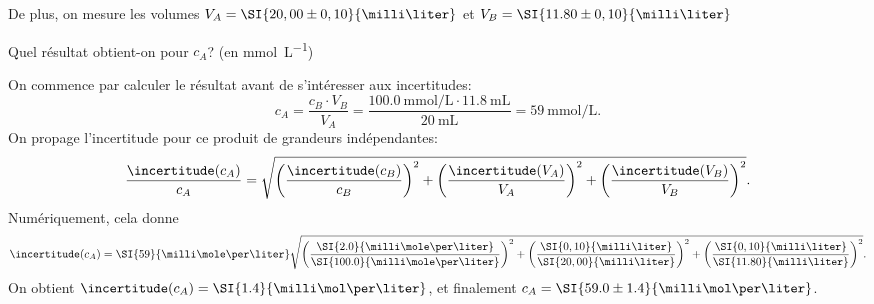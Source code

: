 De plus, on mesure les volumes \( V_A = \SI{20,00\pm 0,10}{\milli\liter} \) et \( V_B = \SI{11.80\pm 0,10}{\milli\liter} \)



\begin{enonce}
  Quel résultat obtient-on pour $c_A$? (en \si{\milli\mol\per\liter})
\end{enonce}


\begin{corrige}
  On commence par calculer le résultat avant de s'intéresser aux incertitudes:
  \[
     c_A=\frac{c_B\cdot V_B}{V_A}= \frac{\SI{100.0}{\milli\mole\per\liter}\cdot \SI{11.8}{\milli\liter}}{\SI{20}{\milli\liter}} = \SI{59}{\milli\mole\per\liter}.
  \]
  On propage l'incertitude pour ce produit de grandeurs indépendantes:
  \[
    \frac{\incertitude(c_A)}{c_A}=\sqrt{\left(\frac{\incertitude(c_B)}{c_B}\right)^2 + \left(\frac{\incertitude(V_A)}{V_A}\right)^2 + \left(\frac{\incertitude(V_B)}{V_B}\right)^2 }.
  \]
  Numériquement, cela donne
  \[
    {\incertitude(c_A)}={\SI{59}{\milli\mole\per\liter}}\sqrt{\left(\frac{\SI{2.0}{\milli\mole\per\liter}}{\SI{100.0}{\milli\mole\per\liter}}\right)^2 + \left(\frac{\SI{0,10}{\milli\liter}}{\SI{20,00}{\milli\liter}}\right)^2 + \left(\frac{\SI{ 0,10}{\milli\liter}}{\SI{11.80}{\milli\liter}}\right)^2 }.
  \]
  On obtient \( {\incertitude(c_A)} = \SI{1.4}{\milli\mol\per\liter} \), et finalement \( c_A=\SI{59.0 \pm 1.4}{\milli\mol\per\liter} \).
\end{corrige}



\finEntrainement



\newpage




\hauteurLargeurCadreReponse		{6mm}{3cm}
\initialisationEntrainement


